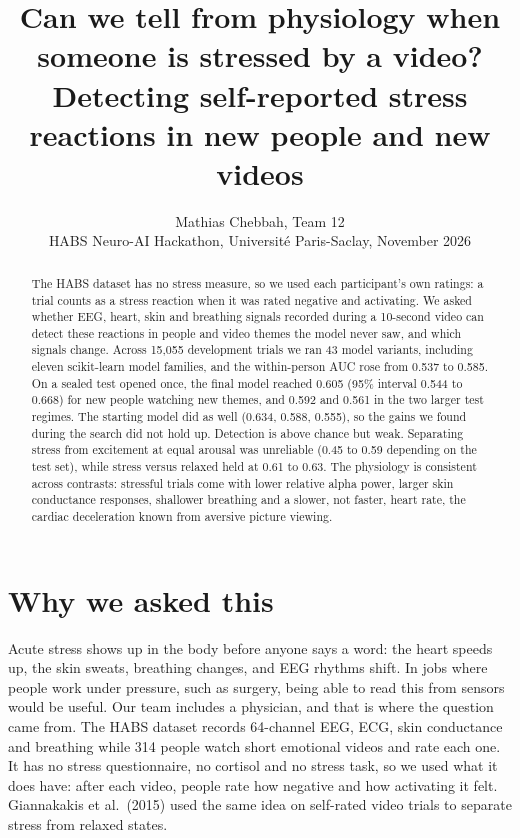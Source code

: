 \documentclass[10pt]{article}
\title{Can we tell from physiology when someone is stressed by a video?\\
Detecting self-reported stress reactions in new people and new videos}
\author{Mathias Chebbah, Team 12\\\small HABS Neuro-AI Hackathon, Universit\'e Paris-Saclay, November 2026}
\date{}
\begin{document}
\maketitle

\begin{abstract}
The HABS dataset has no stress measure, so we used each participant's own
ratings: a trial counts as a stress reaction when it was rated negative and
activating. We asked whether EEG, heart, skin and breathing signals recorded
during a 10-second video can detect these reactions in people and video themes
the model never saw, and which signals change. Across 15,055 development
trials we ran 43 model variants, including eleven scikit-learn model families,
and the within-person AUC rose from 0.537 to 0.585. On a sealed test opened
once, the final model reached 0.605 (95\% interval 0.544 to 0.668) for new
people watching new themes, and 0.592 and 0.561 in the two larger test
regimes. The starting model did as well (0.634, 0.588, 0.555), so the gains we
found during the search did not hold up. Detection is above chance but weak.
Separating stress from excitement at equal arousal was unreliable (0.45 to
0.59 depending on the test set), while stress versus relaxed held at 0.61 to
0.63. The physiology is consistent across contrasts: stressful trials come
with lower relative alpha power, larger skin conductance responses, shallower
breathing and a slower, not faster, heart rate, the cardiac deceleration known
from aversive picture viewing.
\end{abstract}

\section{Why we asked this}

Acute stress shows up in the body before anyone says a word: the heart speeds
up, the skin sweats, breathing changes, and EEG rhythms shift. In jobs where
people work under pressure, such as surgery, being able to read this from
sensors would be useful. Our team includes a physician, and that is where the
question came from. The HABS dataset records 64-channel EEG, ECG, skin
conductance and breathing while 314 people watch short emotional videos and
rate each one. It has no stress questionnaire, no cortisol and no stress task,
so we used what it does have: after each video, people rate how negative and
how activating it felt. Giannakakis et al.\ (2015) used the same idea on
self-rated video trials to separate stress from relaxed states.
\end{document}
